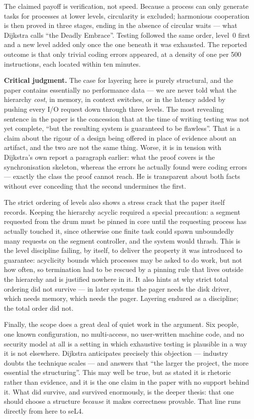 The claimed payoff is verification, not speed. Because a process can only generate tasks for
processes at lower levels, circularity is excluded; harmonious cooperation is then proved in
three stages, ending in the absence of circular waits --- what Dijkstra calls ``the Deadly
Embrace''. Testing followed the same order, level~0 first and a new level added only once
the one beneath it was exhausted. The reported outcome is that only trivial coding errors
appeared, at a density of one per 500 instructions, each located within ten minutes.

\textbf{Critical judgment.}
The case for layering here is purely structural, and the paper contains essentially no
performance data --- we are never told what the hierarchy \emph{cost}, in memory, in
context switches, or in the latency added by pushing every I/O request down through three
levels. The most revealing sentence in the paper is the concession that at the time of
writing testing was not yet complete, ``but the resulting system is guaranteed to be
flawless''. That is a claim about the rigour of a design being offered in place of evidence
about an artifact, and the two are not the same thing. Worse, it is in tension with
Dijkstra's own report a paragraph earlier: what the proof covers is the synchronisation
skeleton, whereas the errors he actually found were coding errors --- exactly the class the
proof cannot reach. He is transparent about both facts without ever conceding that the
second undermines the first.

The strict ordering of levels also shows a stress crack that the paper itself records.
Keeping the hierarchy acyclic required a special precaution: a segment requested from the
drum must be pinned in core until the requesting process has actually touched it, since
otherwise one finite task could spawn unboundedly many requests on the segment controller,
and the system would thrash. This is the level discipline failing, by itself, to
deliver the property it was introduced to guarantee: acyclicity bounds which processes may
be asked to do work, but not how often, so termination had to be rescued by a pinning rule
that lives outside the hierarchy and is justified nowhere in it. It also hints at why strict
total ordering did not survive --- in later systems the pager needs the disk driver, which
needs memory, which needs the pager. Layering endured as a discipline; the total order did
not.

Finally, the scope does a great deal of quiet work in the argument. Six people, one known
configuration, no multi-access, no user-written machine code, and no security model at all
is a setting in which exhaustive testing is plausible in a way it is not elsewhere. Dijkstra
anticipates precisely this objection --- industry doubts the technique scales --- and answers
that ``the larger the project, the more essential the structuring''. This may well be true,
but as stated it is rhetoric rather than evidence, and it is the one claim in the paper with
no support behind it. What did survive, and survived enormously, is the deeper thesis: that
one should choose a structure \emph{because} it makes correctness provable. That line runs
directly from here to seL4.

